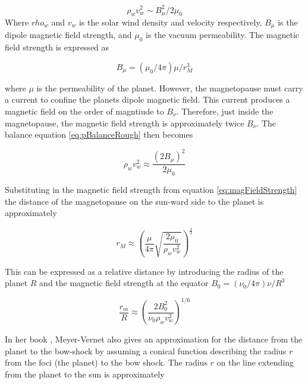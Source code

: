 \begin{equation}\label{eq:pBalanceRough}
\rho_w v^2_w \sim B^2_{\mu} / 2 \mu_0  
\end{equation}
Where $rho_w$ and $v_w$ is the solar wind density and velocity respectively, $B_{\mu}$ is the dipole magnetic field strength, and $\mu_0$ is the vacuum permeability. The magnetic field strength is expressed as

\begin{equation}\label{eq:magFieldStrength}
    B_{\mu} = (\mu_0 / 4 \pi) \mu / r^3_M
\end{equation}

where $\mu$ is the permeability of the planet. However, the magnetopause must carry a current to confine the planets dipole magnetic field. This current produces a magnetic field on the order of magntiude to $B_{\nu}$. Therefore, just inside the magnetopause, the magnetic field strength is approximately twice $B_{\nu}$. The balance equation \ref{eq:pBalanceRough} then becomes 

\begin{equation}\label{eq:pressureBalance}
    \rho_w v^2_w \approx \frac{(2 B_{\mu})^2}{2 \mu_0} 
\end{equation}

Substituting in the magnetic field strength from equation \ref{eq:magFieldStrength} the distance of the magnetopause on the sun-ward side to the planet is approximately 

\begin{equation}\label{eq:magnetopause}
    r_M \approx \left(\frac{\mu}{4 \pi} \sqrt{\frac{2 \mu_0}{\rho_w v^2_w}} \right)^{\frac{1}{3}}
\end{equation}

This can be expressed as a relative distance by introducing the radius of the planet $R$ and the magnetic field strength at the equator $B_0 = (\nu_0 / 4 \pi) \nu / R^3$

\begin{equation}
    \frac{r_m}{R} \approx \left(\frac{2 B^2_0}{\nu_0 \rho_w v^2_w} \right)^{1/6}
\end{equation}


In her book , Meyer-Vernet also gives an approximation for the distance from the planet to the bow-shock by assuming a conical function describing the radius $r$ from the foci (the planet) to the bow shock. The radius $r$ on the line extending from the planet to the sun is approximately

